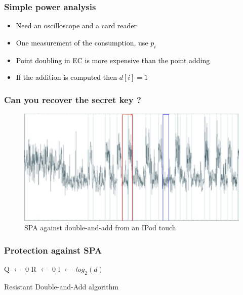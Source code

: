 \documentclass{beamer}
\begin{document}
\begin{frame}
    \frametitle{Simple power analysis}
    \begin{itemize}
        \item \textcolor{black} {Need an oscilloscope and a card reader}
	\item \textcolor{black} {One measurement of the consumption, use $p_{i}$} 
	\item \textcolor{black} {Point doubling in EC is more expensive than the point adding} 
	\item \textcolor{black} {If the addition is computed then $d[i] = 1$}
    \end{itemize}
\end{frame}

\begin{frame}
    \frametitle{Can you recover the secret key ?}
    \begin{figure}
        \centering
        \includegraphics[scale=0.6]{img/spa.png}
        \caption{SPA against double-and-add from an IPod touch}
    \end{figure}
\end{frame}

\begin{frame}
    \frametitle{Protection against SPA}
\begin{algorithm}[H]
    \tiny
    \SetAlgoLined %
   
    \SetSideCommentLeft 
    \SetNoFillComment

    
    
    Q $\leftarrow$ 0\;
    R $\leftarrow$ 0\;
    l $\leftarrow$ $log_2(d)$\;

    \bigskip

    \caption{Resistant Double-and-Add algorithm}
    \label{resistent-daa}
\end{algorithm}
\end{frame}
\end{document}
